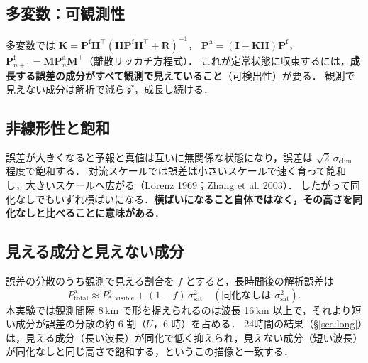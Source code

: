 \documentclass[dvipdfmx,a4paper,10.5pt]{jarticle}
\numberwithin{equation}{section}
\begin{document}
\subsection{多変数：可観測性}
多変数では $\mathbf K = \mathbf P^{\mathrm f}\mathbf H^\top(\mathbf H\mathbf P^{\mathrm f}\mathbf H^\top+\mathbf R)^{-1}$，
$\mathbf P^{\mathrm a} = (\mathbf I-\mathbf K\mathbf H)\mathbf P^{\mathrm f}$，$\mathbf P^{\mathrm f}_{n+1} = \mathbf M\mathbf P^{\mathrm a}_n\mathbf M^\top$（離散リッカチ方程式）．
これが定常状態に収束するには，\textbf{成長する誤差の成分がすべて観測で見えていること}（可検出性）が要る．
観測で見えない成分は解析で減らず，成長し続ける．

\subsection{非線形性と飽和}
誤差が大きくなると予報と真値は互いに無関係な状態になり，誤差は $\sqrt2\,\sigma_{\mathrm{clim}}$ 程度で飽和する．
対流スケールでは誤差は小さいスケールで速く育って飽和し，大きいスケールへ広がる（Lorenz 1969；Zhang et al. 2003）．
したがって同化なしでもいずれ横ばいになる．\textbf{横ばいになること自体ではなく，その高さを同化なしと比べることに意味がある}．

\subsection{見える成分と見えない成分}
誤差の分散のうち観測で見える割合を $f$ とすると，長時間後の解析誤差は
\begin{equation}
  P^{\mathrm a}_{\mathrm{total}} \approx P^{\mathrm a}_{*,\mathrm{visible}} + (1-f)\,\sigma_{\mathrm{sat}}^2 \quad(\text{同化なしは } \sigma_{\mathrm{sat}}^2).
\end{equation}
本実験では観測間隔 8\,km で形を捉えられるのは波長 16\,km 以上で，それより短い成分が誤差の分散の約 6 割（$U$，6 時）を占める．
24時間の結果（\S\ref{sec:long}）は，見える成分（長い波長）が同化で低く抑えられ，見えない成分（短い波長）が同化なしと同じ高さで飽和する，というこの描像と一致する．

\end{document}
